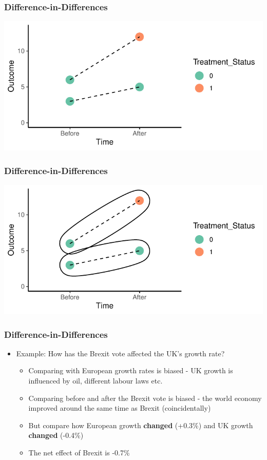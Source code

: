 \documentclass[xcolor=x11names,compress]{beamer}\usepackage[]{graphicx}\usepackage[]{color}
\makeatletter
\def\maxwidth{ %
  \ifdim\Gin@nat@width>\linewidth
    \linewidth
  \else
    \Gin@nat@width
  \fi
}
\newenvironment{knitrout}{}{} %
\renewcommand{\(}{\begin{columns}}
\renewcommand{\)}{\end{columns}}
\newcommand{\<}[1]{\begin{column}{#1}}
\renewcommand{\>}{\end{column}}
\makeatother
\begin{document}
\begin{frame}
\frametitle{Difference-in-Differences}
\begin{knitrout}
\color{fgcolor}
\includegraphics[width=\maxwidth]{figure/DinD_chart_points_c-1} 

\end{knitrout}
\end{frame}

\begin{frame}
\frametitle{Difference-in-Differences}
\begin{knitrout}
\color{fgcolor}
\includegraphics[width=\maxwidth]{figure/DinD_chart_points_d-1} 

\end{knitrout}
\end{frame}

\begin{frame}
\frametitle{Difference-in-Differences}
\begin{itemize}
\item Example: How has the Brexit vote affected the UK's growth rate?
\pause
\begin{itemize}
\item Comparing with European growth rates is biased - UK growth is influenced by oil, different labour laws etc.
\pause
\item Comparing before and after the Brexit vote is biased - the world economy improved around the same time as Brexit (coincidentally)
\pause
\item But compare how European growth \textbf{changed} (+0.3\%) and UK growth \textbf{changed} (-0.4\%)
\pause
\item The net effect of Brexit is -0.7\%
\end{itemize}
\end{itemize}
\end{frame}
\end{document}
